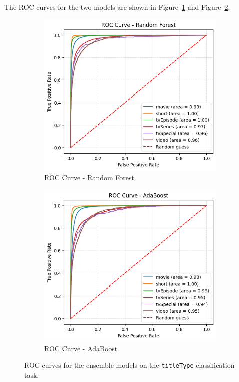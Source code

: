 The ROC curves for the two models are shown in Figure~\ref{fig:roc_rf} and
Figure~\ref{fig:roc_ab}.
\begin{figure}[h]
    \centering
    \begin{subfigure}[b]{0.45\textwidth}
        \centering
        \includegraphics[width=\textwidth]{plotsss/roc_rf_titletype}
        \caption{ROC Curve - Random Forest}
        \label{fig:roc_rf}
    \end{subfigure}
    \hfill
    \begin{subfigure}[b]{0.45\textwidth}
        \centering
        \includegraphics[width=\textwidth]{plotsss/roc_boost_titletype}
        \caption{ROC Curve - AdaBoost}
        \label{fig:roc_ab}
    \end{subfigure}
    \caption{ROC curves for the ensemble models on the \texttt{titleType} classification task.}
    \label{fig:roc_comparison}
\end{figure}

